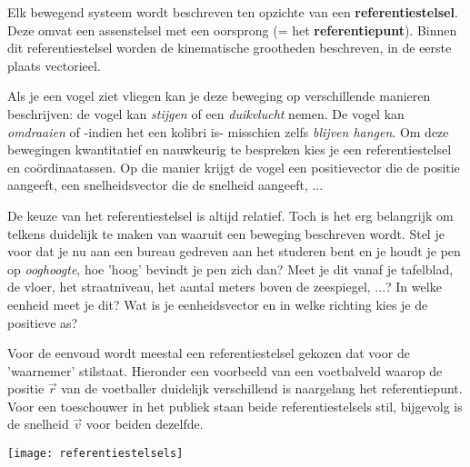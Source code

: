 \documentclass{ximera}
\begin{document}
	\author{Bart Lambregs}
    \xmsource\xmuitleg


Elk bewegend systeem wordt beschreven ten opzichte van een \textbf{referentiestelsel}. Deze omvat een assenstelsel met een oorsprong (= het \textbf{referentiepunt}).
Binnen dit referentiestelsel worden de kinematische grootheden beschreven, in de eerste plaats vectorieel. 
 
Als je een vogel ziet vliegen kan je deze beweging op verschillende manieren beschrijven: de vogel kan \textit{stijgen} of een \textit{duikvlucht} nemen. De vogel kan \textit{omdraaien} of -indien het een kolibri is- misschien zelfs \textit{blijven hangen}. Om deze bewegingen kwantitatief en nauwkeurig te bespreken kies je een referentiestelsel en coördinaatassen. Op die manier krijgt de vogel een positievector die de positie aangeeft, een snelheidsvector die de snelheid aangeeft, ... 

De keuze van het referentiestelsel is altijd relatief. Toch is het erg belangrijk om telkens duidelijk te maken van waaruit een beweging beschreven wordt.
Stel je voor dat je nu aan een bureau gedreven aan het studeren bent en je houdt je pen op \textit{ooghoogte}, hoe 'hoog' bevindt je pen zich dan? Meet je dit vanaf je tafelblad, de vloer, het straatniveau, het aantal meters boven de zeespiegel, ...? In welke eenheid meet je dit? Wat is je eenheidsvector en in welke richting kies je de positieve as? 

Voor de eenvoud wordt meestal een referentiestelsel gekozen dat voor de 'waarnemer' stilstaat. 
Hieronder een voorbeeld van een voetbalveld waarop de positie \(\vec{r}\) van de voetballer duidelijk verschillend is naargelang het referentiepunt.
Voor een toeschouwer in het publiek staan beide referentiestelsels stil, bijgevolg is de snelheid \(\vec{v}\) voor beiden dezelfde.


\begin{center}
\begin{minipage}[t]{0.70\textwidth}
\begin{image}[\linewidth]
	\texttt{[image: referentiestelsels]}
\end{image}
\end{minipage}
\end{center}
\end{document}
